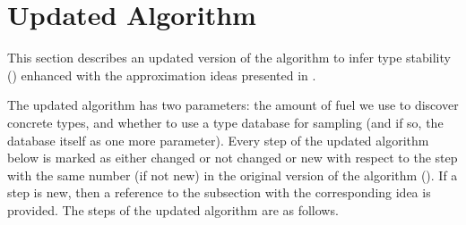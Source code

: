\section{Updated Algorithm} %
\label{sec:approx:algo-final}

This section describes an updated version of the algorithm to infer type
stability () enhanced with the approximation ideas
presented in .

The updated algorithm has two parameters:
the amount of fuel we use to discover concrete types,
and whether to use a type database for sampling (and if so, the database
itself as one more parameter).
Every step of the updated algorithm below is marked as either changed or not
changed or new with respect to the step with the same number (if not new) in the
original version of the algorithm ().
If a step is new, then a reference to the subsection with the corresponding idea is provided.
The steps of the updated algorithm are as follows.
